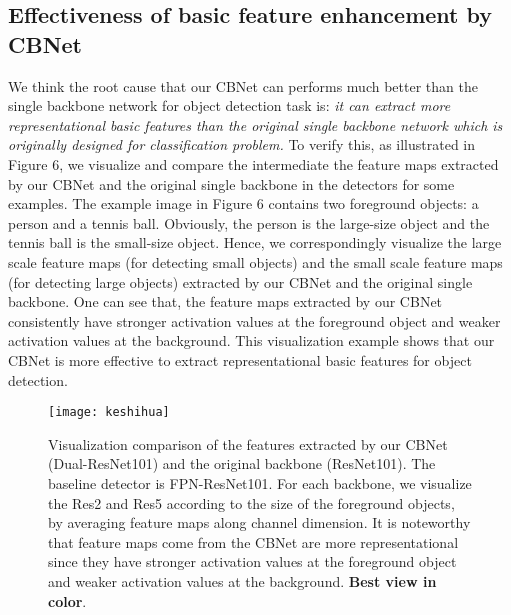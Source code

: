 \documentclass[letterpaper]{article} \usepackage{aaai20}  \usepackage{multirow}
\begin{document}
\subsection{Effectiveness of basic feature enhancement by CBNet}

We think the root cause that our CBNet can performs much better than the single backbone network for object detection task is: \textit{it can extract more representational basic features than the original single backbone network which is originally designed for classification problem.} To verify this, as illustrated in Figure 6, we visualize and compare the intermediate the feature maps extracted by our CBNet and the original single backbone in the detectors for some examples. The example image in Figure 6 contains two foreground objects: a person and a tennis ball. Obviously, the person is the large-size object and the tennis ball is the small-size object. Hence, we correspondingly visualize the large scale feature maps (for detecting small objects) and the small scale feature maps (for detecting large objects) extracted by our CBNet and the original single backbone. One can see that, the feature maps extracted by our CBNet consistently have stronger activation values at the foreground object and weaker activation values at the background. This visualization example shows that our CBNet is more effective to extract representational basic features for object detection.


\begin{figure}[th]
	\centering
	\texttt{[image: keshihua]}
	\caption{Visualization comparison of the features extracted by our CBNet (Dual-ResNet101) and the original backbone (ResNet101). The baseline detector is FPN-ResNet101. For each backbone, we visualize the Res2 and Res5 according to the size of the foreground objects, by averaging feature maps along channel dimension. It is noteworthy that feature maps come from the CBNet are more representational since they have stronger activation values at the foreground object and weaker activation values at the background. \textbf{Best view in color}.}
	\label{fig:four}
\end{figure}
\end{document}
